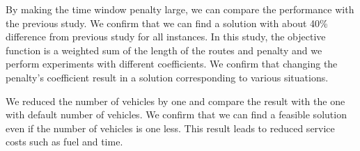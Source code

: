 By making the time window penalty large, we can compare the performance with the previous study. We confirm that we can find a solution with about 40\% difference from previous study for all instances. 
In this study, the objective function is a weighted sum of the length of the routes and penalty and we perform experiments with different coefficients.
We confirm that changing the penalty's coefficient result in a solution corresponding to various situations.

We reduced the number of vehicles by one and compare the result with the one with default number of vehicles. We confirm that we can find a feasible solution even if the number of vehicles is one less.
This result leads to reduced service costs such as fuel and time.
